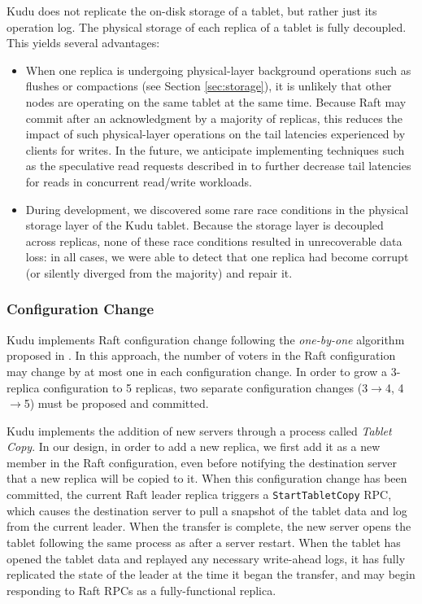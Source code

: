\documentclass[twocolumn,9pt]{article}
\begin{document}
Kudu does not replicate the on-disk storage of a tablet, but rather just
its operation log. The physical storage of each replica of a tablet is fully decoupled.
This yields several advantages:

\begin{itemize}

\item When one replica is undergoing physical-layer background operations such as flushes or compactions
(see Section \ref{sec:storage}), it is unlikely that other nodes are operating on the same tablet at the same time. Because
Raft may commit after an acknowledgment by a majority of replicas, this reduces the impact
of such physical-layer operations on the tail latencies experienced by clients for writes.
In the future, we anticipate implementing techniques such as the speculative read requests
described in \cite{tail_at_scale} to further decrease tail latencies for reads in concurrent read/write
workloads.

\item During development, we discovered some rare race conditions in the physical storage
layer of the Kudu tablet. Because the storage layer is decoupled across replicas, none of these
race conditions resulted in unrecoverable data loss: in all cases, we were able to detect that one
replica had become corrupt (or silently diverged from the majority) and repair it.
\end{itemize}

\subsubsection{Configuration Change}

Kudu implements Raft configuration change following the {\em one-by-one} algorithm proposed in
\cite{diego_thesis}. In this approach, the number of voters in the Raft configuration may change
by at most one in each configuration change. In order to grow a 3-replica configuration to 5
replicas, two separate configuration changes (3$\rightarrow$4, 4$\rightarrow$5) must be proposed
and committed.

Kudu implements the addition of new servers through a process called {\em Tablet Copy}.
In our design, in order to add a new replica, we first add it as a new member in the
Raft configuration, even before notifying the destination server that a new replica will
be copied to it. When this configuration change has been committed, the current Raft leader
replica triggers a {\tt StartTabletCopy} RPC, which causes the destination server to pull a
snapshot of the tablet data and log from the current leader. When the transfer
is complete, the new server opens the tablet following the same process as after
a server restart. When the tablet has opened the tablet data and replayed any necessary
write-ahead logs, it has fully replicated the state of the leader at the time it began the transfer,
and may begin responding to Raft RPCs as a fully-functional replica.
\end{document}
